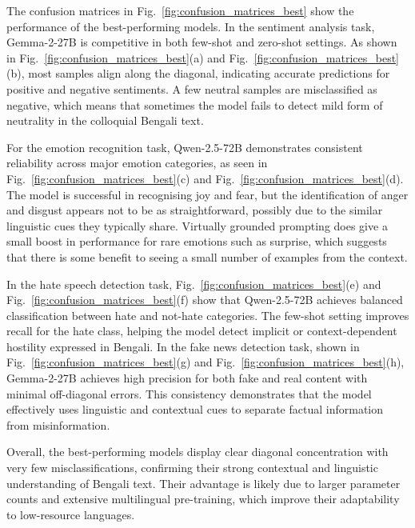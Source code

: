 \documentclass[10pt,letterpaper]{article}
\begin{document}
The confusion matrices in Fig.~\ref{fig:confusion_matrices_best} show the performance of the best-performing models. In the sentiment analysis task, Gemma-2-27B is competitive in both few-shot and zero-shot settings. As shown in Fig.~\ref{fig:confusion_matrices_best}(a) and Fig.~\ref{fig:confusion_matrices_best}(b), most samples align along the diagonal, indicating accurate predictions for positive and negative sentiments. A few neutral samples are misclassified as negative, which means that sometimes the model fails to detect mild form of neutrality in the colloquial Bengali text.

For the emotion recognition task, Qwen-2.5-72B demonstrates consistent reliability across major emotion categories, as seen in Fig.~\ref{fig:confusion_matrices_best}(c) and Fig.~\ref{fig:confusion_matrices_best}(d). The model is successful in recognising joy and fear, but the identification of anger and disgust appears not to be as straightforward, possibly due to the similar linguistic cues they typically share. Virtually grounded prompting does give a small boost in performance for rare emotions such as surprise, which suggests that there is some benefit to seeing a small number of examples from the context.

In the hate speech detection task, Fig.~\ref{fig:confusion_matrices_best}(e) and Fig.~\ref{fig:confusion_matrices_best}(f) show that Qwen-2.5-72B achieves balanced classification between hate and not-hate categories. The few-shot setting improves recall for the hate class, helping the model detect implicit or context-dependent hostility expressed in Bengali. In the fake news detection task, shown in Fig.~\ref{fig:confusion_matrices_best}(g) and Fig.~\ref{fig:confusion_matrices_best}(h), Gemma-2-27B achieves high precision for both fake and real content with minimal off-diagonal errors. This consistency demonstrates that the model effectively uses linguistic and contextual cues to separate factual information from misinformation.

Overall, the best-performing models display clear diagonal concentration with very few misclassifications, confirming their strong contextual and linguistic understanding of Bengali text. Their advantage is likely due to larger parameter counts and extensive multilingual pre-training, which improve their adaptability to low-resource languages.
\end{document}
